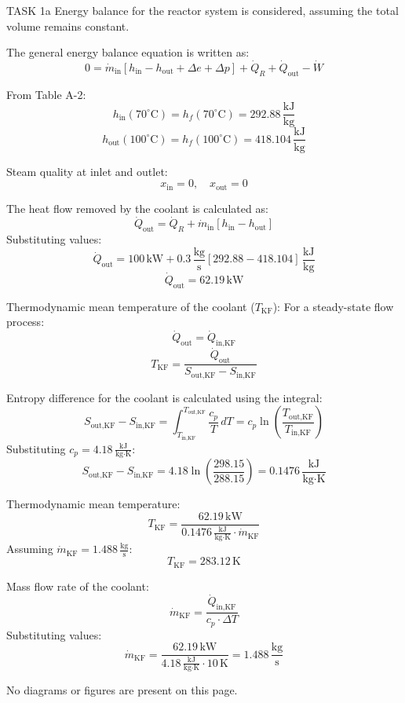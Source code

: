 TASK 1a  
Energy balance for the reactor system is considered, assuming the total volume remains constant.  

The general energy balance equation is written as:  
\[
0 = \dot{m}_{\text{in}} \left[ h_{\text{in}} - h_{\text{out}} + \Delta e + \Delta p \right] + \dot{Q}_R + \dot{Q}_{\text{out}} - \dot{W}
\]  

From Table A-2:  
\[
h_{\text{in}}(70^\circ\text{C}) = h_f(70^\circ\text{C}) = 292.88 \, \frac{\text{kJ}}{\text{kg}}
\]  
\[
h_{\text{out}}(100^\circ\text{C}) = h_f(100^\circ\text{C}) = 418.104 \, \frac{\text{kJ}}{\text{kg}}
\]  

Steam quality at inlet and outlet:  
\[
x_{\text{in}} = 0, \quad x_{\text{out}} = 0
\]  

The heat flow removed by the coolant is calculated as:  
\[
\dot{Q}_{\text{out}} = \dot{Q}_R + \dot{m}_{\text{in}} \left[ h_{\text{in}} - h_{\text{out}} \right]
\]  
Substituting values:  
\[
\dot{Q}_{\text{out}} = 100 \, \text{kW} + 0.3 \, \frac{\text{kg}}{\text{s}} \left[ 292.88 - 418.104 \right] \, \frac{\text{kJ}}{\text{kg}}
\]  
\[
\dot{Q}_{\text{out}} = 62.19 \, \text{kW}
\]  

Thermodynamic mean temperature of the coolant (\( T_{\text{KF}} \)):  
For a steady-state flow process:  
\[
\dot{Q}_{\text{out}} = \dot{Q}_{\text{in,KF}}
\]  
\[
T_{\text{KF}} = \frac{\dot{Q}_{\text{out}}}{S_{\text{out,KF}} - S_{\text{in,KF}}}
\]  

Entropy difference for the coolant is calculated using the integral:  
\[
S_{\text{out,KF}} - S_{\text{in,KF}} = \int_{T_{\text{in,KF}}}^{T_{\text{out,KF}}} \frac{c_p}{T} \, dT = c_p \ln \left( \frac{T_{\text{out,KF}}}{T_{\text{in,KF}}} \right)
\]  
Substituting \( c_p = 4.18 \, \frac{\text{kJ}}{\text{kg·K}} \):  
\[
S_{\text{out,KF}} - S_{\text{in,KF}} = 4.18 \ln \left( \frac{298.15}{288.15} \right) = 0.1476 \, \frac{\text{kJ}}{\text{kg·K}}
\]  

Thermodynamic mean temperature:  
\[
T_{\text{KF}} = \frac{62.19 \, \text{kW}}{0.1476 \, \frac{\text{kJ}}{\text{kg·K}} \cdot \dot{m}_{\text{KF}}}
\]  
Assuming \( \dot{m}_{\text{KF}} = 1.488 \, \frac{\text{kg}}{\text{s}} \):  
\[
T_{\text{KF}} = 283.12 \, \text{K}
\]  

Mass flow rate of the coolant:  
\[
\dot{m}_{\text{KF}} = \frac{\dot{Q}_{\text{in,KF}}}{c_p \cdot \Delta T}
\]  
Substituting values:  
\[
\dot{m}_{\text{KF}} = \frac{62.19 \, \text{kW}}{4.18 \, \frac{\text{kJ}}{\text{kg·K}} \cdot 10 \, \text{K}} = 1.488 \, \frac{\text{kg}}{\text{s}}
\]  

No diagrams or figures are present on this page.